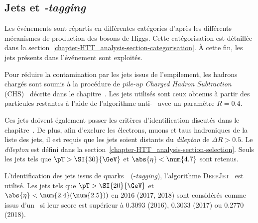 \subsection{Jets et \emph{\quarkb-tagging}}\label{chapter-HTT_analysis-section-objects-jets}
Les événements sont répartis en différentes catégories d'après les différents mécanismes de production des bosons de Higgs.
Cette catégorisation est détaillée dans la section~\ref{chapter-HTT_analysis-section-categorisation}.
À cette fin, les jets présents dans l'événement sont exploités.
\par
Pour réduire la contamination par les jets issus de l'empilement, les hadrons chargés sont soumis à la procédure de \emph{pile-up Charged Hadron Subtraction} (CHS)~\cite{CMS-PAS-JME-14-001} décrite dans le chapitre~.
Les jets utilisés sont ceux obtenus à partir des particules restantes à l'aide de l'algorithme anti-\kT~\cite{Cacciari_antikT} avec un paramètre $R=\num{0.4}$.
\par
Ces jets doivent également passer les critères d'identification discutés dans le chapitre~.
De plus, afin d'exclure les électrons, muons et taus hadroniques de la liste des jets, il est requis que les jets soient distants du \emph{dilepton} de $\Delta R > \num{0.5}$.
Le \emph{dilepton} est défini dans la section~\ref{chapter-HTT_analysis-section-selection}.
Seuls les jets tels que $\pT > \SI{30}{\GeV}$ et $\abs{\eta}<\num{4.7}$ sont retenus.
\par
L'identification des jets issus de quarks~\quarkb\ (\quarkb-\emph{tagging}), l'algorithme \textsc{DeepJet}~\cite{DeepJet} est utilisé.
Les jets tels que $\pT > \SI{20}{\GeV}$ et $\abs{\eta}<\num{2.4} (\num{2.5}))$ en 2016 (2017, 2018) sont considérés comme issus d'un \quarkb\ si leur score est supérieur à \num{0.3093} (2016), \num{0.3033} (2017) ou \num{0.2770} (2018).